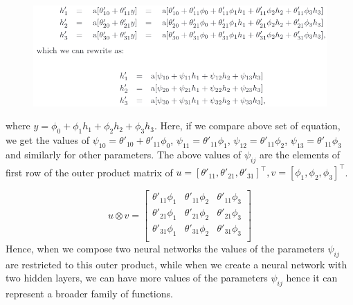 \documentclass[12pt,reqno]{amsart}
\theoremstyle{plain}
\theoremstyle{definition}
\begin{document}
\begin{figure}[!ht]
    \centering
    \includegraphics[scale=.47]{../assets/dl/calc.png}
    \caption{}
\end{figure}
where $y = \phi_0 + \phi_1h_1 + \phi_2h_2 + \phi_3h_3$. Here, if we compare above set of equation, we get the values of $\psi_{10} = \theta'_{10} + \theta'_{11}\phi_0$, $\psi_{11} = \theta'_{11}\phi_1$, $\psi_{12} = \theta'_{11}\phi_2$, $\psi_{13} = \theta'_{11}\phi_3$ and similarly for other parameters. The above values of $\psi_{ij}$ are the elements of first row of the outer product matrix of $ u = [\theta'_{11}, \theta'_{21}, \theta'_{31}]^\top, v = [\phi_1, \phi_2, \phi_3]^\top$.

$$ u \otimes v = \begin{bmatrix}
    \theta'_{11}\phi_1 & \theta'_{11}\phi_2 & \theta'_{11}\phi_3 \\
    \theta'_{21}\phi_1 & \theta'_{21}\phi_2 & \theta'_{21}\phi_3 \\
    \theta'_{31}\phi_1 & \theta'_{31}\phi_2 & \theta'_{31}\phi_3 \\
\end{bmatrix} $$
Hence, when we compose two neural networks the values of the parameters $\psi_{ij}$ are restricted to this outer product, while when we create a neural network with two hidden layers, we can have more values of the parameters $\psi_{ij}$ hence it can represent a broader family of functions.
\end{document}
